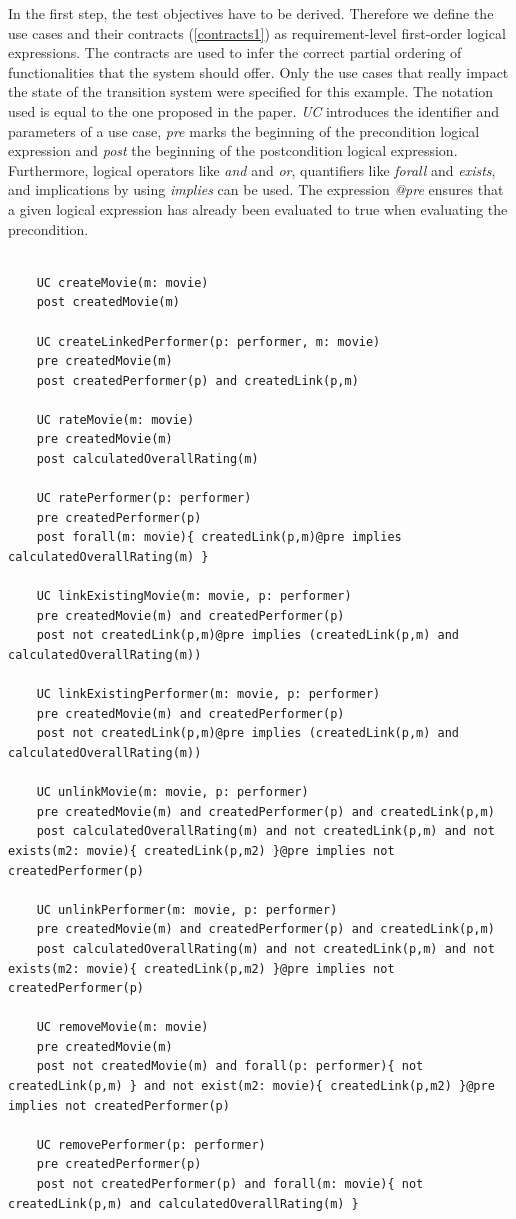 In the first step, the test objectives have to be derived. Therefore we define the use cases and their contracts (\autoref{contracts1}) as requirement-level first-order logical expressions. The contracts are used to infer the correct partial ordering of functionalities that the system should offer. Only the use cases that really impact the state of the transition system were specified for this example. The notation used is equal to the one proposed in the paper. \textit{UC} introduces the identifier and parameters of a use case, \textit{pre} marks the beginning of the precondition logical expression and \textit{post} the beginning of the postcondition logical expression. Furthermore, logical operators like \textit{and} and \textit{or}, quantifiers like \textit{forall} and \textit{exists}, and implications by using \textit{implies} can be used. The expression \textit{@pre} ensures that a given logical expression has already been evaluated to true when evaluating the precondition. 

\begin{lstlisting}[caption={Contracts attached to use cases},label={contracts1}]
	
	UC createMovie(m: movie)
	post createdMovie(m)
	
	UC createLinkedPerformer(p: performer, m: movie)
	pre createdMovie(m)
	post createdPerformer(p) and createdLink(p,m)
	
	UC rateMovie(m: movie)
	pre createdMovie(m)
	post calculatedOverallRating(m)
	
	UC ratePerformer(p: performer)
	pre createdPerformer(p)
	post forall(m: movie){ createdLink(p,m)@pre implies calculatedOverallRating(m) }
	
	UC linkExistingMovie(m: movie, p: performer)
	pre createdMovie(m) and createdPerformer(p)
	post not createdLink(p,m)@pre implies (createdLink(p,m) and calculatedOverallRating(m))
	
	UC linkExistingPerformer(m: movie, p: performer)
	pre createdMovie(m) and createdPerformer(p)
	post not createdLink(p,m)@pre implies (createdLink(p,m) and calculatedOverallRating(m))
	
	UC unlinkMovie(m: movie, p: performer)
	pre createdMovie(m) and createdPerformer(p) and createdLink(p,m)
	post calculatedOverallRating(m) and not createdLink(p,m) and not exists(m2: movie){ createdLink(p,m2) }@pre implies not createdPerformer(p)
	
	UC unlinkPerformer(m: movie, p: performer)
	pre createdMovie(m) and createdPerformer(p) and createdLink(p,m)
	post calculatedOverallRating(m) and not createdLink(p,m) and not exists(m2: movie){ createdLink(p,m2) }@pre implies not createdPerformer(p)
	
	UC removeMovie(m: movie)
	pre createdMovie(m)
	post not createdMovie(m) and forall(p: performer){ not createdLink(p,m) } and not exist(m2: movie){ createdLink(p,m2) }@pre implies not createdPerformer(p)
	
	UC removePerformer(p: performer)
	pre createdPerformer(p)
	post not createdPerformer(p) and forall(m: movie){ not createdLink(p,m) and calculatedOverallRating(m) }
\end{lstlisting}

